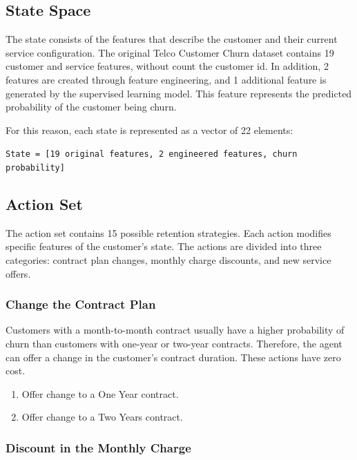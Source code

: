 \documentclass{article}
\begin{document}
\subsection{State Space}

The state consists of the features that describe the customer and their current service configuration.
The original Telco Customer Churn dataset contains 19 customer and service features, without count the customer id. In addition,
2 features are created through feature engineering, and 1 additional feature is generated by the
supervised learning model. This feature represents the predicted probability of the customer
being churn. 

For this reason, each state is represented as a vector of 22 elements:

\begin{center}
\texttt{State = [19 original features, 2 engineered features, churn probability]}
\end{center}


\subsection{Action Set}

The action set contains 15 possible retention strategies. Each action modifies specific features
of the customer's state. The actions are divided into three categories: contract plan changes,
monthly charge discounts, and new service offers.

\subsubsection{Change the Contract Plan}

Customers with a month-to-month contract usually have a higher probability of churn than customers
with one-year or two-year contracts. Therefore, the agent can offer a change in the customer's
contract duration. These actions have zero cost.

\begin{enumerate}
\item Offer change to a One Year contract.
\item Offer change to a Two Years contract.
\end{enumerate}

\subsubsection{Discount in the Monthly Charge}
\end{document}

